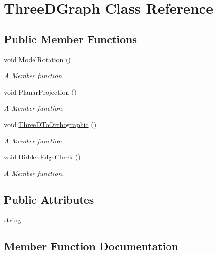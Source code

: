 \hypertarget{classThreeDGraph}{}\section{Three\+D\+Graph Class Reference}
\label{classThreeDGraph}
\subsection*{Public Member Functions}
\begin{DoxyCompactItemize}
\item 
void \hyperlink{classThreeDGraph_abc739a0c4de5c007b113558992d96968}{Model\+Rotation} ()
\begin{DoxyCompactList}\small\item\em A Member function. \end{DoxyCompactList}\item 
void \hyperlink{classThreeDGraph_a89922d3d78cdc0152dfd2974e66e7d5d}{Planar\+Projection} ()
\begin{DoxyCompactList}\small\item\em A Member function. \end{DoxyCompactList}\item 
void \hyperlink{classThreeDGraph_a7f484956c7d616b6724e758ed43e5bed}{Three\+D\+To\+Orthographic} ()
\begin{DoxyCompactList}\small\item\em A Member function. \end{DoxyCompactList}\item 
void \hyperlink{classThreeDGraph_a33b4bb0d5a42dba80e987b3d709347a0}{Hidden\+Edge\+Check} ()
\begin{DoxyCompactList}\small\item\em A Member function. \end{DoxyCompactList}\end{DoxyCompactItemize}
\subsection*{Public Attributes}
\begin{DoxyCompactItemize}
\item 
\hyperlink{classThreeDGraph_aa428236bdac3937b96f2d361161eaae5}{string}
\end{DoxyCompactItemize}


\subsection{Member Function Documentation}
